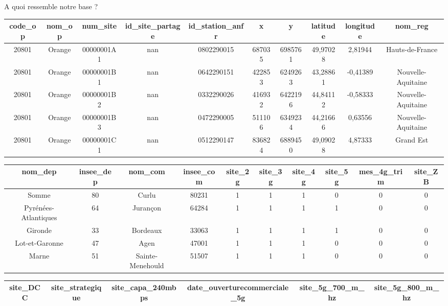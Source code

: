 {
\smallframetitle
\begin{frame}{A quoi ressemble notre base ?}
    \begin{table}[H]
        \centering
        \tiny
        \begin{tabular}{cccccccccc}
        \hline
            \textbf{code\_op} & \textbf{nom\_op} & \textbf{num\_site} & \textbf{id\_site\_partage} & \textbf{id\_station\_anfr} & \textbf{x} & \textbf{y} & \textbf{latitude} & \textbf{longitude} & \textbf{nom\_reg} \\ \hline
            20801 & Orange & 00000001A1 & nan & 0802290015 & 687035 & 6985761 & 49,97028 & 2,81944 & Hauts-de-France \\ 
            20801 & Orange & 00000001B1 & nan & 0642290151 & 422853 & 6249263 & 43,28861 & -0,41389 & Nouvelle-Aquitaine \\ 
            20801 & Orange & 00000001B2 & nan & 0332290026 & 416932 & 6422196 & 44,84112 & -0,58333 & Nouvelle-Aquitaine \\ 
            20801 & Orange & 00000001B3 & nan & 0472290005 & 511106 & 6349234 & 44,21666 & 0,63556 & Nouvelle-Aquitaine \\ 
            20801 & Orange & 00000001C1 & nan & 0512290147 & 836824 & 6889450 & 49,09028 & 4,87333 & Grand Est \\ \hline
        \end{tabular}
        \begin{tabular}{cccccccccc}
        \hline
            \textbf{nom\_dep} & \textbf{insee\_dep} & \textbf{nom\_com} & \textbf{insee\_com} & \textbf{site\_2g} & \textbf{site\_3g} & \textbf{site\_4g} & \textbf{site\_5g} & \textbf{mes\_4g\_trim} & \textbf{site\_ZB} \\ \hline
            Somme & 80 & Curlu & 80231 & 1 & 1 & 1 & 0 & 0 & 0 \\ 
            Pyrénées-Atlantiques & 64 & Jurançon & 64284 & 1 & 1 & 1 & 1 & 0 & 0 \\ 
            Gironde & 33 & Bordeaux & 33063 & 1 & 1 & 1 & 1 & 0 & 0 \\ 
            Lot-et-Garonne & 47 & Agen & 47001 & 1 & 1 & 1 & 0 & 0 & 0 \\ 
            Marne & 51 & Sainte-Menehould & 51507 & 1 & 1 & 1 & 0 & 0 & 0 \\ \hline
        \end{tabular}
        \begin{tabular}{cccccc}
        \hline
            \textbf{site\_DCC} & \textbf{site\_strategique} & \textbf{site\_capa\_240mbps} & \textbf{date\_ouverturecommerciale\_5g} & \textbf{site\_5g\_700\_m\_hz} & \textbf{site\_5g\_800\_m\_hz} \\ \hline

\end{tabular}
\end{table}
\end{frame}}
